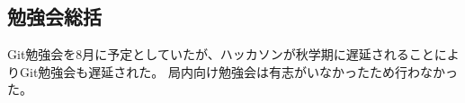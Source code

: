 \subsection*{勉強会総括}


Git勉強会を8月に予定としていたが、ハッカソンが秋学期に遅延されることによりGit勉強会も遅延された。
局内向け勉強会は有志がいなかったため行わなかった。
